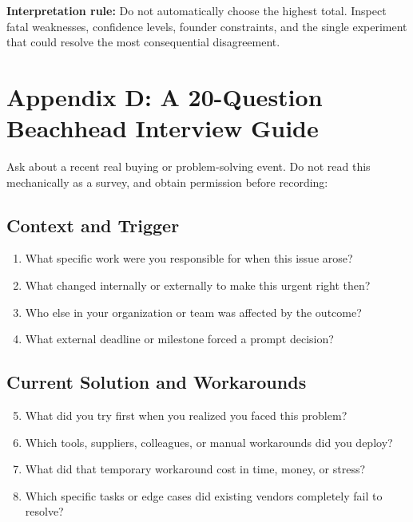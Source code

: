 \textbf{Interpretation rule:} Do not automatically choose the highest total. Inspect fatal weaknesses, confidence levels, founder constraints, and the single experiment that could resolve the most consequential disagreement.

\section*{Appendix D: A 20-Question Beachhead Interview Guide}

Ask about a recent real buying or problem-solving event. Do not read this mechanically as a survey, and obtain permission before recording:

\subsection*{Context and Trigger}
\begin{enumerate}
    \item What specific work were you responsible for when this issue arose?
    \item What changed internally or externally to make this urgent right then?
    \item Who else in your organization or team was affected by the outcome?
    \item What external deadline or milestone forced a prompt decision?
\end{enumerate}

\subsection*{Current Solution and Workarounds}
\begin{enumerate}
    \setcounter{enumi}{4}
    \item What did you try first when you realized you faced this problem?
    \item Which tools, suppliers, colleagues, or manual workarounds did you deploy?
    \item What did that temporary workaround cost in time, money, or stress?
    \item Which specific tasks or edge cases did existing vendors completely fail to resolve?
\end{enumerate}

